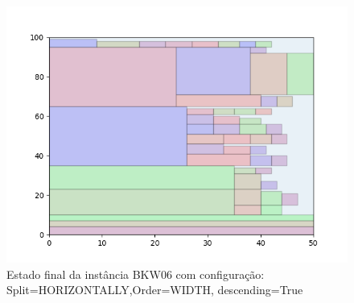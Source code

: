 \begin{figure}[H]
    \centering
    \caption[]{Estado final da instância BKW06 com configuração: Split=HORIZONTALLY,Order=WIDTH, descending=True}
    \label{fig:bkw06-horizontally-width-true}
    \includegraphics[scale=0.5]{output/figures/bkw/bkw06/horizontally/width/true/00}
\end{figure}